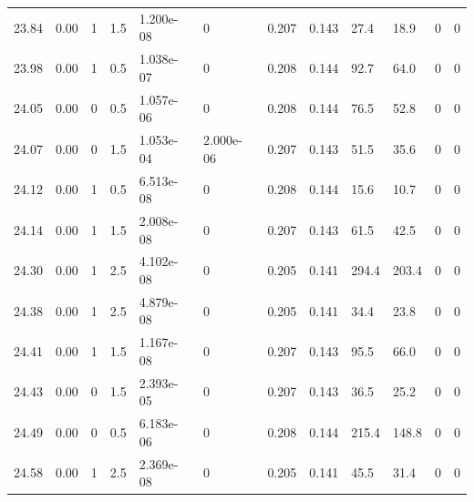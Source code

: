 \documentclass[preview]{standalone}
\begin{document}
{{{{{{{\begin{tabular}{L{1.2cm}C{1.2cm} C{0.3cm}C{0.5cm} C{1.4cm}C{1.4cm} C{1.4cm}C{1.4cm} C{1.6cm}C{1.6cm} C{1.6cm}C{1.6cm}}
  23.84  &  0.00  & 1     & 1.5 &  1.200e-08  & 0  &  0.207&   0.143& 27.4 & 18.9   &  0 & 0  \\ 
  23.98  &  0.00  & 1     & 0.5 &  1.038e-07  & 0  &  0.208&   0.144& 92.7 & 64.0   &  0 & 0  \\ 
  24.05  &  0.00  & 0     & 0.5 &  1.057e-06  & 0  &  0.208&   0.144& 76.5 & 52.8   &  0 & 0  \\ 
  24.07  &  0.00  & 0     & 1.5 &  1.053e-04  & 2.000e-06  &  0.207&   0.143& 51.5 & 35.6   &  0 & 0  \\ 
  24.12  &  0.00  & 1     & 0.5 &  6.513e-08  & 0  &  0.208&   0.144& 15.6 & 10.7   &  0 & 0  \\ 
  24.14  &  0.00  & 1     & 1.5 &  2.008e-08  & 0  &  0.207&   0.143& 61.5 & 42.5   &  0 & 0  \\ 
  24.30  &  0.00  & 1     & 2.5 &  4.102e-08  & 0  &  0.205&   0.141& 294.4 & 203.4   &  0 & 0  \\ 
  24.38  &  0.00  & 1     & 2.5 &  4.879e-08  & 0  &  0.205&   0.141& 34.4 & 23.8   &  0 & 0  \\ 
  24.41  &  0.00  & 1     & 1.5 &  1.167e-08  & 0  &  0.207&   0.143& 95.5 & 66.0   &  0 & 0  \\ 
  24.43  &  0.00  & 0     & 1.5 &  2.393e-05  & 0  &  0.207&   0.143& 36.5 & 25.2   &  0 & 0  \\ 
  24.49  &  0.00  & 0     & 0.5 &  6.183e-06  & 0  &  0.208&   0.144& 215.4 & 148.8   &  0 & 0  \\ 
  24.58  &  0.00  & 1     & 2.5 &  2.369e-08  & 0  &  0.205&   0.141& 45.5 & 31.4   &  0 & 0  \\ 
\hline 
\end{tabular} 

}}}}}}}
\end{document}
